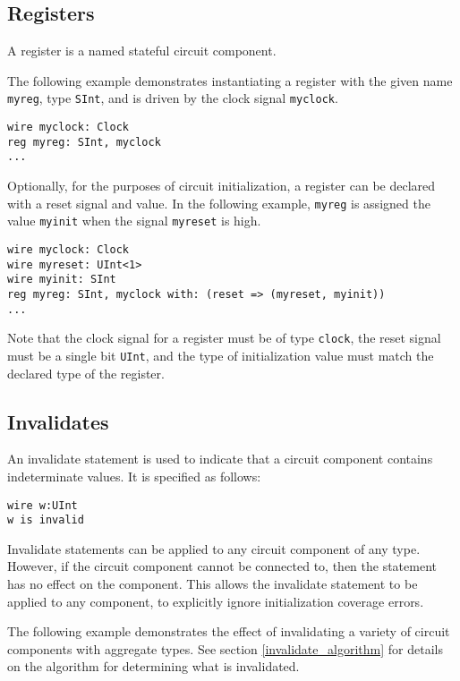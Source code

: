 \documentclass[12pt]{article}
\begin{document}
\subsection{Registers}
A register is a named stateful circuit component.

The following example demonstrates instantiating a register with the given name \verb|myreg|, type \verb|SInt|, and is driven by the clock signal \verb|myclock|.

\begin{lstlisting}
wire myclock: Clock
reg myreg: SInt, myclock
...
\end{lstlisting}

Optionally, for the purposes of circuit initialization, a register can be declared with a reset signal and value. In the following example, \verb|myreg| is assigned the value \verb|myinit| when the signal \verb|myreset| is high.

\begin{lstlisting}
wire myclock: Clock
wire myreset: UInt<1>
wire myinit: SInt
reg myreg: SInt, myclock with: (reset => (myreset, myinit))
...
\end{lstlisting}

Note that the clock signal for a register must be of type \verb|clock|, the reset signal must be a single bit \verb|UInt|, and the type of initialization value must match the declared type of the register.

\subsection{Invalidates}
An invalidate statement is used to indicate that a circuit component contains indeterminate values. It is specified as follows:

\begin{lstlisting}
wire w:UInt
w is invalid
\end{lstlisting}

Invalidate statements can be applied to any circuit component of any type. However, if the circuit component cannot be connected to, then the statement has no effect on the component. This allows the invalidate statement to be applied to any component, to explicitly ignore initialization coverage errors.

The following example demonstrates the effect of invalidating a variety of circuit components with aggregate types. See section \ref{invalidate_algorithm} for details on the algorithm for determining what is invalidated.
\end{document}
